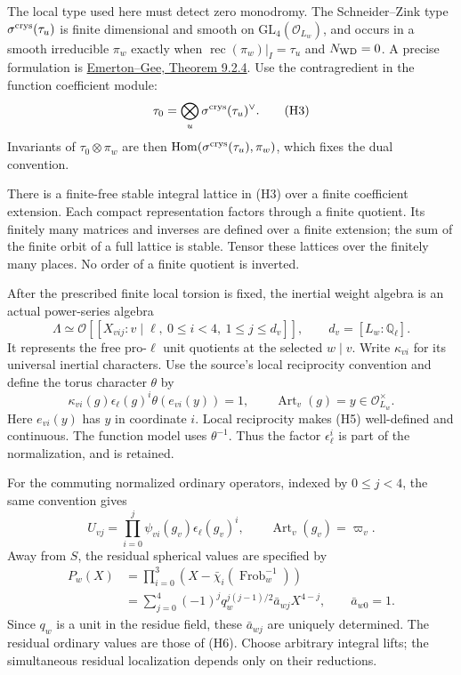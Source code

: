 The local type used here must detect zero monodromy.
The Schneider--Zink type \(\sigma^{\rm crys}(\tau_u)\)
is finite dimensional and smooth on
\(\mathrm{GL}_4(\mathcal O_{L_w})\), and occurs in a smooth
irreducible \(\pi_w\) exactly when
\(\operatorname{rec}(\pi_w)|_I=\tau_u\) and \(N_{\rm WD}=0\).
A precise formulation is
\href{https://math.uchicago.edu/~emerton/pdffiles/bonn-lectures-survey-article.pdf}
{Emerton--Gee, Theorem 9.2.4}.
Use the contragredient in the function coefficient module:
\[
              \tau_0=\bigotimes_u
                              \sigma^{\rm crys}(\tau_u)^\vee .
 \tag{H3}
\]
Invariants of \(\tau_0\otimes\pi_w\) are then
\(\operatorname{Hom}(\sigma^{\rm crys}(\tau_u),\pi_w)\),
which fixes the dual convention.

There is a finite-free stable integral lattice in (H3)
over a finite coefficient extension.
Each compact representation factors through a finite quotient.
Its finitely many matrices and inverses are defined over
a finite extension; the sum of the finite orbit of a full
lattice is stable.
Tensor these lattices over the finitely many places.
No order of a finite quotient is inverted.

After the prescribed finite local torsion is fixed, the
inertial weight algebra is an actual power-series algebra
\[
 \Lambda\simeq
 \mathcal O[[X_{vij}:v\mid\ell,\ 0\le i<4,\ 1\le j\le d_v]],
           \qquad d_v=[L_w:\mathbb Q_\ell].
 \tag{H4}
\]
It represents the free pro-\(\ell\) unit quotients at
the selected \(w\mid v\).
Write \(\kappa_{vi}\) for its universal inertial characters.
Use the source's local reciprocity convention and define
the torus character \(\theta\) by
\[
 \kappa_{vi}(g)\epsilon_\ell(g)^i
                  \theta(e_{vi}(y))=1,\qquad
            \operatorname{Art}_v(g)=y\in\mathcal O_{L_w}^{\times}.
 \tag{H5}
\]
Here \(e_{vi}(y)\) has \(y\) in coordinate \(i\).
Local reciprocity makes (H5) well-defined and continuous.
The function model uses \(\theta^{-1}\).
Thus the factor \(\epsilon_\ell^i\) is part of the
normalization, and is retained.

For the commuting normalized ordinary operators, indexed
by \(0\le j<4\), the same convention gives
\[
       U_{vj}=\prod_{i=0}^{j}
                  \psi_{vi}(g_v)\epsilon_\ell(g_v)^i,
                  \qquad\operatorname{Art}_v(g_v)=\varpi_v .
 \tag{H6}
\]
Away from \(S\), the residual spherical values are specified by
\[
 \begin{split}
 P_w(X)&=\prod_{i=0}^3
          (X-\bar\chi_i(\operatorname{Frob}_w^{-1}))\\
       &=\sum_{j=0}^{4}(-1)^j
                  q_w^{j(j-1)/2}\bar a_{wj}X^{4-j},
                        \qquad\bar a_{w0}=1 .
 \end{split}
 \tag{H7}
\]
Since \(q_w\) is a unit in the residue field, these
\(\bar a_{wj}\) are uniquely determined.
The residual ordinary values are those of (H6).
Choose arbitrary integral lifts; the simultaneous residual
localization depends only on their reductions.

